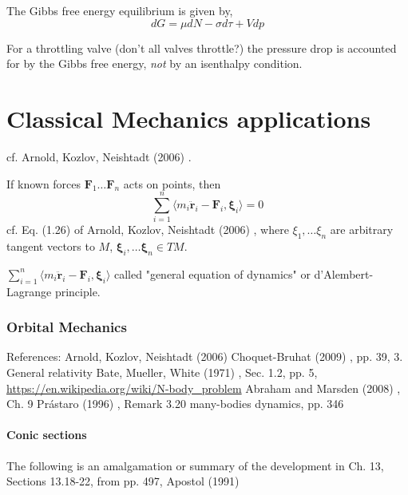 \documentclass[10pt]{amsart}
\begin{document}
\begin{multicols*}{2}
The Gibbs free energy equilibrium is given by, 
\[
dG = \mu dN - \sigma d\tau + V dp
\]

For a throttling valve (don't all valves throttle?) the pressure drop is accounted for by the Gibbs free energy, \emph{not} by an isenthalpy condition. 

\part{Classical Mechanics applications}

cf. Arnold, Kozlov, Neishtadt (2006) \cite{AKN2006}. 

If known forces $\mathbf{F}_1 \dots \mathbf{F}_n$ acts on points, then 
\begin{equation}
\sum_{i=1}^n \langle m_i \ddot{ \mathbf{r}}_i - \mathbf{F}_i , \mathbf{\xi}_i \rangle = 0
\end{equation}
cf. Eq. (1.26) of Arnold, Kozlov, Neishtadt (2006) \cite{AKN2006}, where $\xi_1 , \dots \xi_n$ are arbitrary tangent vectors to $M$, $\mathbf{\xi}_i, \dots \mathbf{\xi}_n \in TM$.  

$\sum_{i=1}^n \langle m_i \ddot{ \mathbf{r}}_i - \mathbf{F}_i , \mathbf{\xi}_i \rangle$ called "general equation of dynamics" or d'Alembert-Lagrange principle.  

\section{Orbital Mechanics}

References:
Arnold, Kozlov, Neishtadt (2006) \cite{AKN2006}
Choquet-Bruhat (2009) \cite{YChoquet-Bruhat2009}, pp. 39, 3. General relativity
Bate, Mueller, White (1971) \cite{BMW1971}, Sec. 1.2, pp. 5, \url{https://en.wikipedia.org/wiki/N-body_problem}
Abraham and Marsden (2008) \cite{AbMa2008}, Ch. 9
Pr\'{a}staro (1996) \cite{Pras1996}, Remark 3.20 many-bodies dynamics, pp. 346


\subsection{Conic sections}

The following is an amalgamation or summary of the development in Ch. 13, Sections 13.18-22, from pp. 497, Apostol (1991) \cite{Apos1991}


\end{multicols*}
\end{document}
